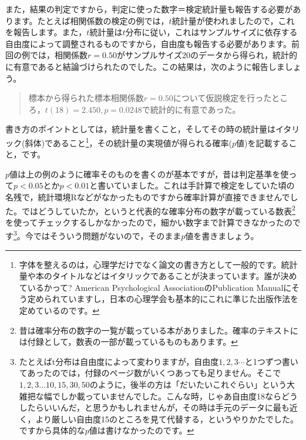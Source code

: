 \documentclass{ltjsbook}
\begin{document}
また，結果の判定ですから，判定に使った数字＝検定統計量も報告する必要があります。たとえば相関係数の検定の例では，$t$統計量が使われましたので，これを報告します。また，$t$統計量は$t$分布に従い，これはサンプルサイズに依存する自由度によって調整されるものですから，自由度も報告する必要があります。前回の例では，相関係数$r=0.50$がサンプルサイズ20のデータから得られ，統計的に有意であると結論づけられたのでした。この結果は，次のように報告しましょう。
\begin{quote}
	標本から得られた標本相関係数$r=0.50$について仮説検定を行ったところ，$t(18)=2.450,p=0.0248$で統計的に有意であった。
\end{quote}
書き方のポイントとしては，統計量を書くこと，そしてその時の統計量はイタリック(斜体)であること\footnote{字体を整えるのは，心理学だけでなく論文の書き方として一般的です。統計量や本のタイトルなどはイタリックであることが決まっています。誰が決めているかって? American Psychological AssociationのPublication Manualにそう定められていますし，日本の心理学会も基本的にこれに準じた出版作法を定めているのです。}，その統計量の実現値が得られる確率($p$値)を記載すること，です。

$p$値は上の例のように確率そのものを書くのが基本ですが，昔は判定基準を使って$p<0.05$とか$p<0.01$と書いていました。これは手計算で検定をしていた頃の名残で，統計環境Rなどがなかったものですから確率計算が直接できませんでした。ではどうしていたか，というと代表的な確率分布の数字が載っている数表\footnote{昔は確率分布の数字の一覧が載っている本がありました。確率のテキストには付録として，数表の一部が載っているものもあります。}を使ってチェックするしかなかったので，細かい数字まで計算できなかったのです\footnote{たとえばt分布は自由度によって変わりますが，自由度$1,2,3\cdots$と1つずつ書いてあったのでは，付録のページ数がいくつあっても足りません。そこで$1,2,3...10,15,30,50$のように，後半の方は「だいたいこれぐらい」という大雑把な幅でしか載っていませんでした。こんな時，じゃあ自由度18ならどうしたらいいんだ，と思うかもしれませんが，その時は手元のデータに最も近く，より厳しい自由度15のところを見て代替する，というやりかたでした。ですから具体的な$p$値は書けなかったのです。}。今ではそういう問題がないので，そのまま$p$値を書きましょう。
\end{document}
